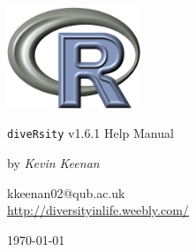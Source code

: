 \begin{titlepage}
\begin{center}
\includegraphics[width=40mm]{Rlogo_3.png}
\end{center}
\begin{center}
\LARGE
\texttt{diveRsity} v1.6.1 Help Manual
\end{center}
\begin{center}
\Large
by \emph{Kevin Keenan}
\end{center}
\begin{center}
\normalsize
kkeenan02@qub.ac.uk\\
\vspace{0.5cm}
\url{http://diversityinlife.weebly.com/}
\end{center}
\begin{center}
\small
\today
\end{center}
\end{titlepage}